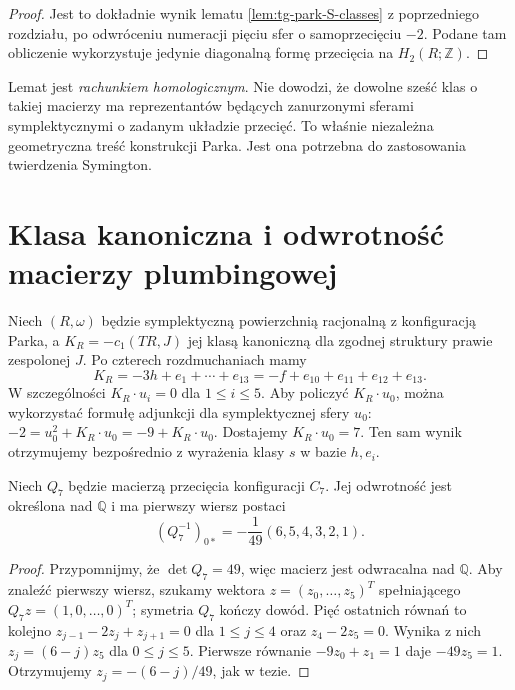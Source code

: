 \begin{proof}
Jest to dokładnie wynik lematu
\ref{lem:tg-park-S-classes} z poprzedniego rozdziału,
po odwróceniu numeracji pięciu sfer o samoprzecięciu $-2$.
Podane tam obliczenie wykorzystuje jedynie diagonalną
formę przecięcia na $H_2(R;\mathbb Z)$.
\end{proof}

\begin{uwaga}
Lemat jest \emph{rachunkiem homologicznym}.
Nie dowodzi, że dowolne sześć klas o takiej macierzy
ma reprezentantów będących zanurzonymi sferami
symplektycznymi o zadanym układzie przecięć.
To właśnie niezależna geometryczna treść konstrukcji Parka.
Jest ona potrzebna do zastosowania twierdzenia Symington.
\end{uwaga}

\section{Klasa kanoniczna i odwrotność macierzy plumbingowej}
\label{sec:tg-park14-canonical}

Niech $(R,\omega)$ będzie symplektyczną powierzchnią
racjonalną z konfiguracją Parka, a $K_R=-c_1(TR,J)$
jej klasą kanoniczną dla zgodnej struktury prawie
zespolonej $J$. Po czterech rozdmuchaniach mamy
\[
K_R=-3h+e_1+\cdots+e_{13}
    =-f+e_{10}+e_{11}+e_{12}+e_{13}.
\]
W szczególności $K_R\cdot u_i=0$ dla $1\le i\le5$.
Aby policzyć $K_R\cdot u_0$, można wykorzystać
formułę adjunkcji dla symplektycznej sfery $u_0$:
$-2=u_0^2+K_R\cdot u_0=-9+K_R\cdot u_0$.
Dostajemy $K_R\cdot u_0=7$. Ten sam wynik otrzymujemy
bezpośrednio z wyrażenia klasy $s$ w bazie $h,e_i$.

\begin{lemat}
\label{lem:tg-park14-inverse}
Niech $Q_7$ będzie macierzą przecięcia konfiguracji $C_7$.
Jej odwrotność jest określona nad $\mathbb Q$ i ma pierwszy
wiersz postaci
\[
(Q_7^{-1})_{0*}=-\frac1{49}(6,5,4,3,2,1).
\]
\end{lemat}

\begin{proof}
Przypomnijmy, że $\det Q_7=49$, więc macierz jest
odwracalna nad $\mathbb Q$. Aby znaleźć pierwszy wiersz,
szukamy wektora $z=(z_0,\ldots,z_5)^T$ spełniającego
$Q_7z=(1,0,\ldots,0)^T$; symetria $Q_7$ kończy dowód.
Pięć ostatnich równań to kolejno
$z_{j-1}-2z_j+z_{j+1}=0$ dla $1\le j\le4$
oraz $z_4-2z_5=0$. Wynika z nich
$z_j=(6-j)z_5$ dla $0\le j\le5$.
Pierwsze równanie $-9z_0+z_1=1$ daje
$-49z_5=1$. Otrzymujemy
$z_j=-(6-j)/49$, jak w tezie.
\end{proof}

